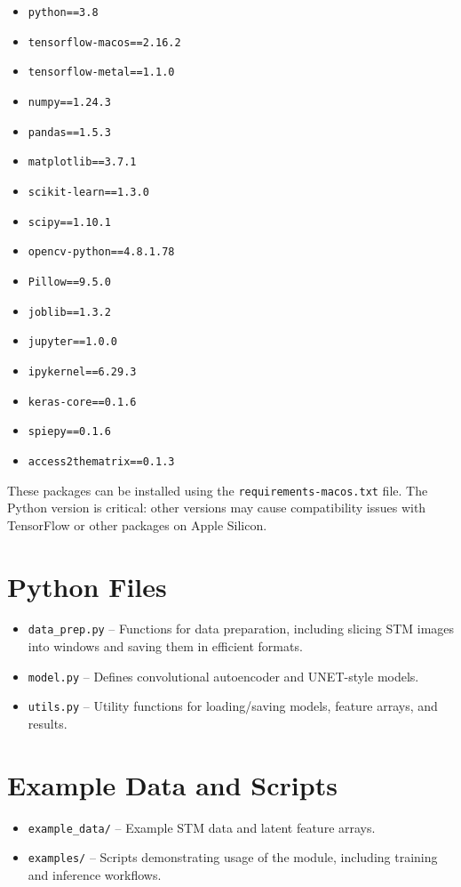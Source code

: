 \documentclass[11pt]{article}
\begin{document}
\begin{itemize}
  \item \texttt{python==3.8}
  \item \texttt{tensorflow-macos==2.16.2}
  \item \texttt{tensorflow-metal==1.1.0}
  \item \texttt{numpy==1.24.3}
  \item \texttt{pandas==1.5.3}
  \item \texttt{matplotlib==3.7.1}
  \item \texttt{scikit-learn==1.3.0}
  \item \texttt{scipy==1.10.1}
  \item \texttt{opencv-python==4.8.1.78}
  \item \texttt{Pillow==9.5.0}
  \item \texttt{joblib==1.3.2}
  \item \texttt{jupyter==1.0.0}
  \item \texttt{ipykernel==6.29.3}
  \item \texttt{keras-core==0.1.6}
  \item \texttt{spiepy==0.1.6}
  \item \texttt{access2thematrix==0.1.3}
\end{itemize}

These packages can be installed using the \texttt{requirements-macos.txt} file. The Python version is critical: other versions may cause compatibility issues with TensorFlow or other packages on Apple Silicon.

\section*{Python Files}
\begin{itemize}
  \item \texttt{data\_prep.py} – Functions for data preparation, including slicing STM images into windows and saving them in efficient formats.
  \item \texttt{model.py} – Defines convolutional autoencoder and UNET-style models.
  \item \texttt{utils.py} – Utility functions for loading/saving models, feature arrays, and results.
\end{itemize}

\section*{Example Data and Scripts}
\begin{itemize}
  \item \texttt{example\_data/} – Example STM data and latent feature arrays.
  \item \texttt{examples/} – Scripts demonstrating usage of the module, including training and inference workflows.
\end{itemize}
\end{document}
